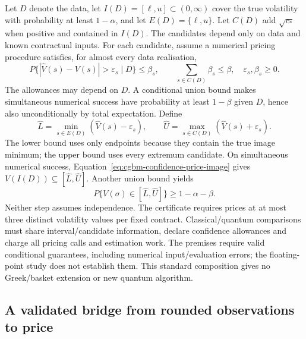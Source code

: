 \documentclass[11pt]{article}
\begin{document}
Let $D$ denote the data, let $I(D)=[\ell,u]\subset(0,\infty)$ cover the true volatility
with probability at least $1-\alpha$, and let $E(D)=\{\ell,u\}$.
Let $C(D)$ add $\sqrt{c_*}$ when positive and contained in $I(D)$.
The candidates depend only on data and known contractual inputs.
For each candidate, assume a numerical pricing procedure satisfies,
for almost every data realisation,
\begin{equation}
 P\{|\widehat V(s)-V(s)|>\varepsilon_s\mid D\}\leq\beta_s,
 \qquad \sum_{s\in C(D)}\beta_s\leq\beta,
 \quad \varepsilon_s,\beta_s\geq0.
 \label{eq:cgbm-conditional-numerical-confidence}
\end{equation}
The allowances may depend on $D$. A conditional union bound makes
simultaneous numerical success have probability at least $1-\beta$
given $D$, hence also unconditionally by total expectation. Define
\begin{equation}
 \widehat L=\min_{s\in E(D)}(\widehat V(s)-\varepsilon_s),
 \qquad \widehat U=\max_{s\in C(D)}(\widehat V(s)+\varepsilon_s).
 \label{eq:cgbm-composed-price-interval}
\end{equation}
The lower bound uses only endpoints because they contain the true
image minimum; the upper bound uses every extremum candidate.
On simultaneous numerical success,
Equation~\eqref{eq:cgbm-confidence-price-image} gives
$V(I(D))\subseteq[\widehat L,\widehat U]$. Another union bound yields
\begin{equation}
 P\{V(\sigma)\in[\widehat L,\widehat U]\}\geq1-\alpha-\beta.
 \label{eq:cgbm-composed-price-coverage}
\end{equation}
Neither step assumes independence. The certificate requires prices at at most three distinct volatility
values per fixed contract. Classical/quantum comparisons must share interval/candidate information,
declare confidence allowances and charge all pricing calls and estimation
work. The premises
require valid conditional guarantees, including numerical input/evaluation
errors; the floating-point study does not establish them. This standard
composition gives no Greek/basket extension or new quantum algorithm.

\subsection{A validated bridge from rounded observations to price}
\label{app:cgbm-validated-calibration}
\end{document}
